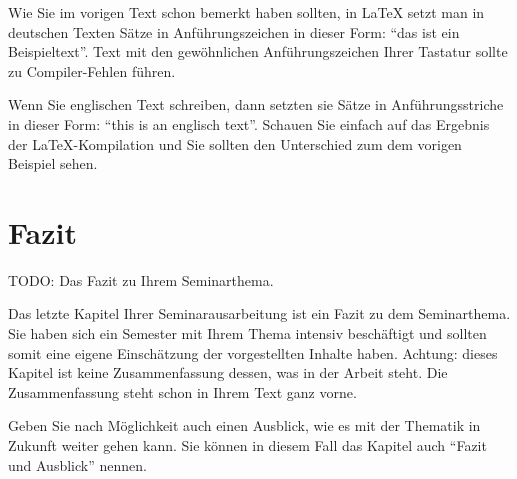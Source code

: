\documentclass[a4paper,twoside]{IEEEtran}
\begin{document}
Wie Sie im vorigen Text schon bemerkt haben sollten, in LaTeX setzt man in deutschen Texten Sätze in Anführungszeichen in dieser Form: "`das ist ein Beispieltext"'. Text mit den gewöhnlichen Anführungszeichen Ihrer Tastatur sollte zu Compiler-Fehlen führen.

Wenn Sie englischen Text schreiben, dann setzten sie Sätze in Anführungsstriche in dieser Form: ``this is an englisch text''. Schauen Sie einfach auf das Ergebnis der LaTeX-Kompilation und Sie sollten den Unterschied zum dem vorigen Beispiel sehen.


\section{Fazit}
TODO: Das Fazit zu Ihrem Seminarthema.

Das letzte Kapitel Ihrer Seminarausarbeitung ist ein Fazit zu dem Seminarthema. Sie haben sich ein Semester mit Ihrem Thema intensiv beschäftigt und sollten somit eine eigene Einschätzung der vorgestellten Inhalte haben. Achtung: dieses Kapitel ist keine Zusammenfassung dessen, was in der Arbeit steht. Die Zusammenfassung steht schon in Ihrem Text ganz vorne.

Geben Sie nach Möglichkeit auch einen Ausblick, wie es mit der Thematik in Zukunft weiter gehen kann. Sie können in diesem Fall das Kapitel auch "`Fazit und Ausblick"' nennen.




\end{document}
